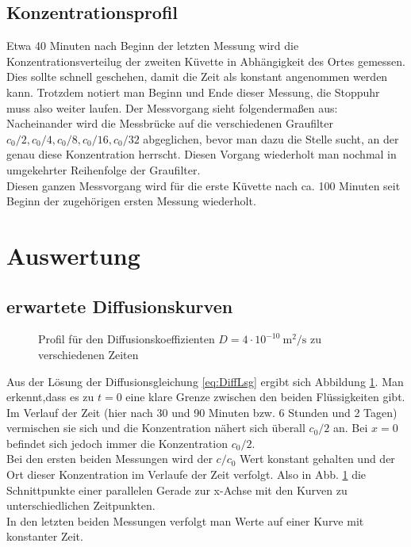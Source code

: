 \documentclass[12pt,a4paper,titlepage,headinclude,bibtotoc]{scrartcl}
\begin{document}
\subsection{Konzentrationsprofil}
Etwa 40 Minuten nach Beginn der letzten Messung wird die Konzentrationsverteilug der zweiten Küvette in Abhängigkeit des Ortes gemessen.
Dies sollte schnell geschehen, damit die Zeit als konstant angenommen werden kann.
Trotzdem notiert man Beginn und Ende dieser Messung, die Stoppuhr muss also weiter laufen.
Der Messvorgang sieht folgendermaßen aus:
Nacheinander wird die Messbrücke auf die verschiedenen Graufilter $c_0/2, c_0/4, c_0/8, c_0/16, c_0/32$ abgeglichen, bevor man dazu die Stelle sucht, an der genau diese Konzentration herrscht.
Diesen Vorgang wiederholt man nochmal in umgekehrter Reihenfolge der Graufilter.\\
Diesen ganzen Messvorgang wird für die erste Küvette nach ca. 100 Minuten  seit Beginn der zugehörigen ersten Messung wiederholt. 

\section{Auswertung}
\label{sec:auswertung}

\subsection{erwartete Diffusionskurven}
\begin{figure}
	
	\caption{Profil für den Diffusionskoeffizienten $D=4\cdot 10^{-10} ~ \si{\meter ^2 / \second}$ zu verschiedenen Zeiten}
	\label{fig:erwDiffKurve}
\end{figure}

Aus der Lösung der Diffusionsgleichung \eqref{eq:DiffLsg} ergibt sich Abbildung \ref{fig:erwDiffKurve}.
Man erkennt,dass es zu $t=0$ eine klare Grenze zwischen den beiden Flüssigkeiten gibt.
Im Verlauf der Zeit (hier nach 30 und 90 Minuten bzw. 6 Stunden und 2 Tagen) vermischen sie sich und die Konzentration nähert sich überall $c_0/2$ an.
Bei $x=0$ befindet sich jedoch immer die Konzentration $c_0/2$.\\
Bei den ersten beiden Messungen wird der $c/c_0$ Wert konstant gehalten und der Ort dieser Konzentration im Verlaufe der Zeit verfolgt.
Also in Abb. \ref{fig:erwDiffKurve} die Schnittpunkte einer parallelen Gerade zur x-Achse mit den Kurven zu unterschiedlichen Zeitpunkten.\\
In den letzten beiden Messungen verfolgt man Werte auf einer Kurve mit konstanter Zeit.
\end{document}

